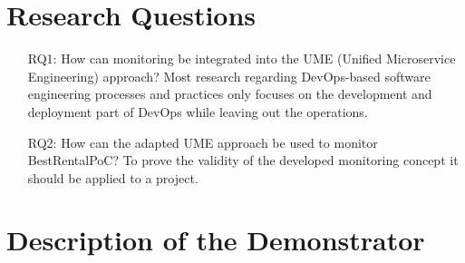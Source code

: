 \section{Research Questions}
\label{sec:rq}




\begin{enumerate}
	\item[RQ1:] How can monitoring be integrated into the UME (Unified Microservice Engineering) approach?
	Most research regarding DevOps-based software engineering processes and practices only focuses
	on the development and deployment part of DevOps while leaving out the operations.

	\item[RQ2:] How can the adapted UME approach be used to monitor BestRentalPoC?
	To prove the validity of the developed monitoring concept it should be applied
	to a project.
\end{enumerate}

\section{Description of the Demonstrator}
\label{sec:desc_demonstrator}

